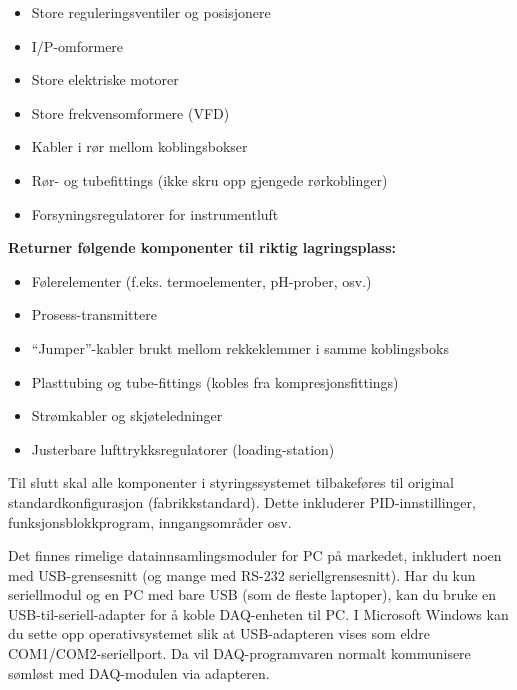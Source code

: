 \begin{itemize}
\item{} Store reguleringsventiler og posisjonere
\item{} I/P-omformere
\item{} Store elektriske motorer
\item{} Store frekvensomformere (VFD)
\item{} Kabler i rør mellom koblingsbokser
\item{} Rør- og tubefittings (ikke skru opp gjengede rørkoblinger)
\item{} Forsyningsregulatorer for instrumentluft
\end{itemize}

\vskip 10pt

\indent
{\bf Returner følgende komponenter til riktig lagringsplass:}

\begin{itemize}
\item{} Følerelementer (f.eks. termoelementer, pH-prober, osv.)
\item{} Prosess-transmittere
\item{} ``Jumper''-kabler brukt mellom rekkeklemmer i samme koblingsboks
\item{} Plasttubing og tube-fittings (kobles fra kompresjonsfittings)
\item{} Strømkabler og skjøteledninger
\item{} Justerbare lufttrykksregulatorer (loading-station)
\end{itemize}

\vskip 10pt

Til slutt skal alle komponenter i styringssystemet tilbakeføres til original standardkonfigurasjon (fabrikkstandard). Dette inkluderer PID-innstillinger, funksjonsblokkprogram, inngangsområder osv.








Det finnes rimelige datainnsamlingsmoduler for PC på markedet, inkludert noen med USB-grensesnitt (og mange med RS-232 seriellgrensesnitt). Har du kun seriellmodul og en PC med bare USB (som de fleste laptoper), kan du bruke en USB-til-seriell-adapter for å koble DAQ-enheten til PC. I Microsoft Windows kan du sette opp operativsystemet slik at USB-adapteren vises som eldre COM1/COM2-seriellport. Da vil DAQ-programvaren normalt kommunisere sømløst med DAQ-modulen via adapteren.

